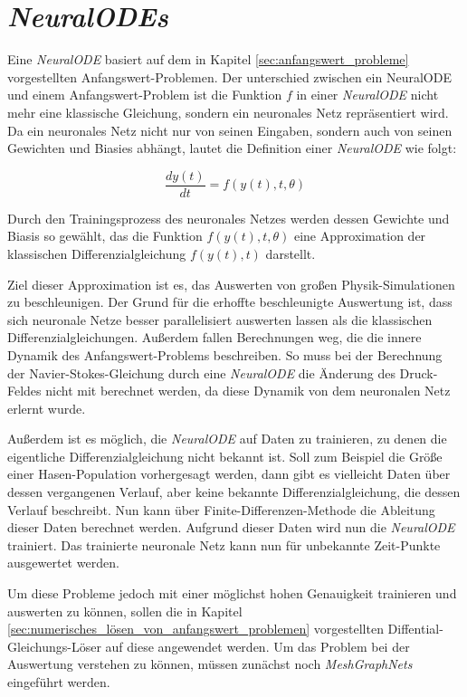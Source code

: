
\section{\textit{NeuralODEs}} \label{sec:neural_ode}

Eine \textit{NeuralODE} \cite{neuralode} basiert auf dem in Kapitel \ref{sec:anfangswert_probleme} vorgestellten Anfangswert-Problemen.
Der unterschied zwischen ein NeuralODE und einem Anfangswert-Problem ist 
die Funktion $f$ in einer \textit{NeuralODE} nicht mehr eine klassische Gleichung, 
sondern ein neuronales Netz repräsentiert wird.
Da ein neuronales Netz nicht nur von seinen Eingaben, 
sondern auch von seinen Gewichten und Biasies abhängt,
lautet die Definition einer \textit{NeuralODE} wie folgt:

$$
\frac{d y(t)}{dt} = f(y(t), t, \theta)
$$

Durch den Trainingsprozess des neuronales Netzes werden dessen Gewichte und Biasis 
so gewählt, das die Funktion $f(y(t), t, \theta)$ eine Approximation der klassischen 
Differenzialgleichung $f(y(t), t)$ darstellt.

Ziel dieser Approximation ist es, das Auswerten von großen Physik-Simulationen zu beschleunigen.
Der Grund für die erhoffte beschleunigte Auswertung ist, dass sich neuronale Netze besser parallelisiert auswerten lassen
als die klassischen Differenzialgleichungen.
Außerdem fallen Berechnungen weg, die die innere Dynamik des Anfangswert-Problems beschreiben.
So muss bei der Berechnung der Navier-Stokes-Gleichung durch eine \textit{NeuralODE} die Änderung des Druck-Feldes 
nicht mit berechnet werden, da diese Dynamik von dem neuronalen Netz erlernt wurde.

Außerdem ist es möglich, die \textit{NeuralODE} auf Daten zu trainieren, 
zu denen die eigentliche Differenzialgleichung nicht bekannt ist.
Soll zum Beispiel die Größe einer Hasen-Population vorhergesagt werden, dann gibt es vielleicht Daten über dessen 
vergangenen Verlauf, aber keine bekannte Differenzialgleichung, die dessen Verlauf beschreibt.
Nun kann über Finite-Differenzen-Methode die Ableitung dieser Daten berechnet werden.
Aufgrund dieser Daten wird nun die \textit{NeuralODE} trainiert.
Das trainierte neuronale Netz kann nun für unbekannte Zeit-Punkte ausgewertet werden.

Um diese Probleme jedoch mit einer möglichst hohen Genauigkeit trainieren und auswerten zu können,
sollen die in Kapitel \ref{sec:numerisches_lösen_von_anfangswert_problemen} vorgestellten Diffential-Gleichungs-Löser auf diese angewendet werden.
Um das Problem bei der Auswertung verstehen zu können, müssen zunächst noch \textit{MeshGraphNets} eingeführt werden.






